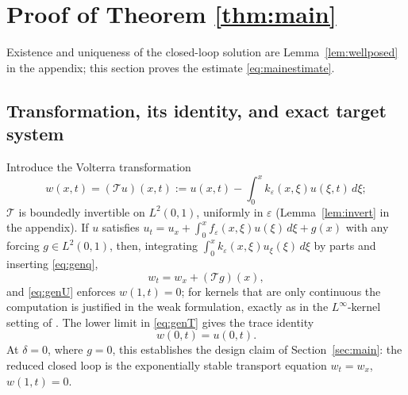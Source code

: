 \documentclass[12pt]{article}
\theoremstyle{plain}
\theoremstyle{remark}
\newcommand{\TT}{\mathcal T}
\begin{document}
\section{Proof of Theorem \ref{thm:main}}\label{sec:proof}
Existence and uniqueness of the closed-loop solution are Lemma~\ref{lem:wellposed} in the appendix; this section proves the estimate \eqref{eq:mainestimate}.

\subsection{Transformation, its identity, and exact target system}
Introduce the Volterra transformation
\begin{equation}
 w(x,t)=(\TT u)(x,t):=u(x,t)-\int_0^xk_\varepsilon(x,\xi)u(\xi,t)\,d\xi ;
 \label{eq:genT}
\end{equation}
$\TT$ is boundedly invertible on $L^2(0,1)$, uniformly in $\varepsilon$ (Lemma~\ref{lem:invert} in the appendix). If $u$ satisfies $u_t=u_x+\int_0^xf_\varepsilon(x,\xi)u(\xi)\,d\xi+g(x)$ with any forcing $g\in L^2(0,1)$, then, integrating $\int_0^xk_\varepsilon(x,\xi)u_\xi(\xi)\,d\xi$ by parts and inserting \eqref{eq:genq},
\begin{equation}
 w_t=w_x+(\TT g)(x),
 \label{eq:Tidentity}
\end{equation}
and \eqref{eq:genU} enforces $w(1,t)=0$; for kernels that are only continuous the computation is justified in the weak formulation, exactly as in the $L^\infty$-kernel setting of \cite{HuDiMeglio2016}. The lower limit in \eqref{eq:genT} gives the trace identity
\begin{equation}
 w(0,t)=u(0,t).
 \label{eq:traceidentity}
\end{equation}
At $\delta=0$, where $g=0$, this establishes the design claim of Section~\ref{sec:main}: the reduced closed loop is the exponentially stable transport equation $w_t=w_x$, $w(1,t)=0$.
\end{document}
